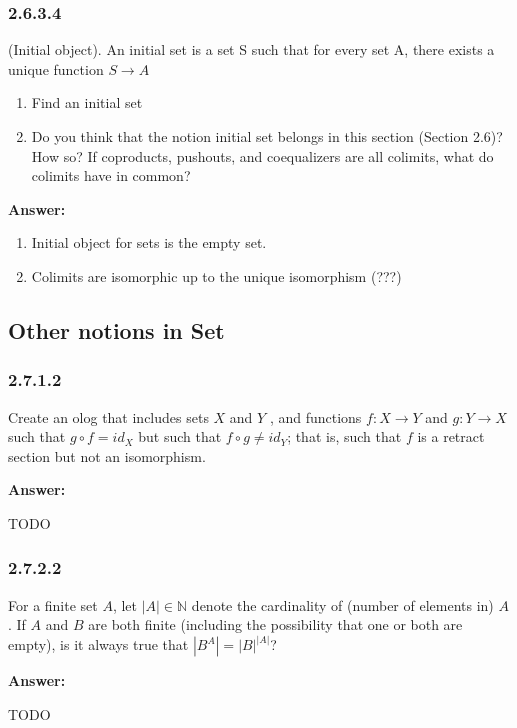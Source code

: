 \documentclass{article}
\newcommand{\N}{\mathbb{N}}
\newcommand{\vsp}[0]{\vspace*{10pt}\par}
\newcommand{\exercise}[1]{\subsubsection*{#1}}
\newcommand{\ans}[0]{\vsp\textbf{Answer: }\vsp}
\newcommand{\ei}{\item}
\newcommand{\eb}{\begin{enumerate}[label=(\alph*)]\ei}
\newcommand{\ee}{\end{enumerate}}
\begin{document}
\begin{center}
\end{center}


\exercise{2.6.3.4}

(Initial object). An initial set is a set S such that for every set A, there
exists a unique function $S \to A$

\eb Find an initial set
\ei Do you think that the notion initial set belongs in this section (Section
    2.6)? How so? If coproducts, pushouts, and coequalizers are all colimits,
    what do colimits have in common?
\ee

\ans

\eb Initial object for sets is the empty set.
\ei Colimits are isomorphic up to the unique isomorphism (???)
\ee

\subsection{Other notions in Set}

\exercise{2.7.1.2}

Create an olog that includes sets $X$ and $Y$ , and functions $f : X \to Y$ and
$g: Y \to X$ such that $g \circ f = id_X$ but such that $f \circ g \ne id_Y$;
that is, such that $f$ is a retract section but not an isomorphism.

\ans

TODO

\exercise{2.7.2.2}

For a finite set $A$, let $|A| \in \N$ denote the cardinality of (number of
elements in) $A$. If $A$ and $B$ are both finite (including the possibility that
one or both are empty), is it always true that $|B^A| = |B|^{|A|}$?

\ans

TODO
\end{document}
